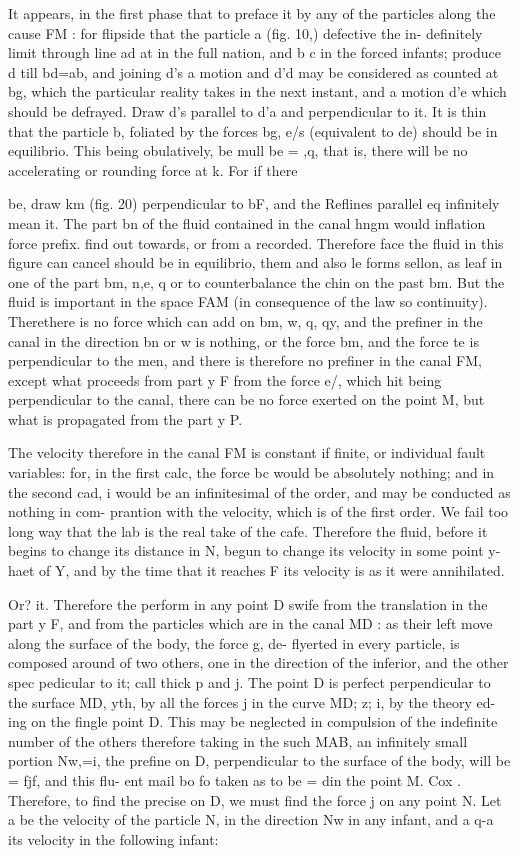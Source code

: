 \documentclass{article}
\begin{document}
It appears, in the first phase that to preface it by any of the particles along the cause FM : for flipside that the particle a (fig. 10,) defective the in- definitely limit through line ad at in the full nation, and b c in the forced infants; produce d till bd=ab, and joining d’s a motion and d’d may be considered as counted at bg, which the particular reality takes in the next instant, and a motion d’e which should be defrayed. Draw d’s parallel to d’a and perpendicular to it. It is thin that the particle b, foliated by the forces bg, e/s (equivalent to de) should be in equilibrio. This being obulatively, be mull be = ,q, that is, there will be no accelerating or rounding force at k. For if there

be, draw km (fig. 20) perpendicular to bF, and the Reflines parallel eq infinitely mean it. The part bn of the fluid contained in the canal hngm would inflation force prefix. find out towards, or from a recorded. Therefore face the fluid in this figure can cancel should be in equilibrio, them and also le forms sellon, as leaf in one of the part bm, n,e, q or to counterbalance the chin on the past bm. But the fluid is important in the space FAM (in consequence of the law so continuity). Therethere is no force which can add on bm, w, q, qy, and the prefiner in the canal in the direction bn or w is nothing, or the force bm, and the force te is perpendicular to the men, and there is therefore no prefiner in the canal FM, except what proceeds from part y F from the force e/, which hit being perpendicular to the canal, there can be no force exerted on the point M, but what is propagated from the part y P.

The velocity therefore in the canal FM is constant if finite, or individual fault variables: for, in the first calc, the force bc would be absolutely nothing; and in the second cad, i would be an infinitesimal of the order, and may be conducted as nothing in com- prantion with the velocity, which is of the first order. We fail too long way that the lab is the real take of the cafe. Therefore the fluid, before it begins to change its distance in N, begun to change its velocity in some point y-haet of Y, and by the time that it reaches F its velocity is as it were annihilated.

Or? it. Therefore the perform in any point D swife from the translation in the part y F, and from the particles which are in the canal MD : as their left move along the surface of the body, the force g, de- flyerted in every particle, is composed around of two others, one in the direction of the inferior, and the other spec pedicular to it; call thick p and j. The point D is perfect perpendicular to the surface MD, yth, by all the forces j in the curve MD; z; i, by the theory ed- ing on the fingle point D. This may be neglected in compulsion of the indefinite number of the others therefore taking in the such MAB, an infinitely small portion Nw,=i, the prefine on D, perpendicular to the surface of the body, will be = fjf, and this flu- ent mail bo fo taken as to be = din the point M. Cox . Therefore, to find the precise on D, we must find the force j on any point N. Let a be the velocity of the particle N, in the direction Nw in any infant, and a q-a its velocity in the following infant:
\end{document}
